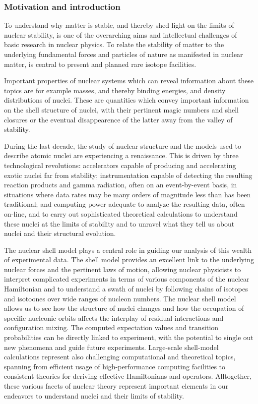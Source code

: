 \documentclass{beamer}
\begin{document}
\begin{frame}
\titlepage
\end{frame}

\begin{frame}
\frametitle{Motivation and introduction}

\begin{block}{}
To understand why matter is stable, and thereby shed light on the
limits of nuclear stability, is one of the overarching aims and
intellectual challenges of basic research in nuclear physics. To
relate the stability of matter to the underlying fundamental forces
and particles of nature as manifested in nuclear matter, is central to
present and planned rare isotope facilities.  

Important properties of nuclear systems which can reveal information about these topics are
for example masses, and thereby binding energies, and density
distributions of nuclei.  These are quantities which convey important
information on the shell structure of nuclei, with their pertinent
magic numbers and shell closures or the eventual disappearence of the
latter away from the valley of stability.  

During the last decade,  the study of nuclear
structure and the models used to describe atomic nuclei are
experiencing a renaissance. This is driven by three technological
revolutions: accelerators capable of producing and accelerating exotic
nuclei far from stability; instrumentation capable of detecting the
resulting reaction products and gamma radiation, often on an
event-by-event basis, in situations where data rates may be many
orders of magnitude less than has been traditional; and computing
power adequate to analyze the resulting data, often on-line, and to
carry out sophisticated theoretical calculations to understand these
nuclei at the limits of stability and to unravel what they tell us
about nuclei and their structural evolution. 

The nuclear shell model plays a central role in guiding our analysis
of this wealth of experimental data.  
The shell model provides an
excellent link to the underlying nuclear forces and the pertinent laws
of motion, allowing nuclear physicists to interpret complicated
experiments in terms of various components of the nuclear Hamiltonian
and to understand a swath of nuclei by following chains of isotopes
and isotoones over wide ranges of nucleon numbers. The nuclear shell
model allows us to see how the structure of nuclei changes and how the
occupation of specific nucleonic orbits affects the interplay of
residual interactions and configuration mixing.  The computed
expectation values and transition probabilities can be directly linked
to experiment, with the potential to single out new phenomena and
guide future experiments.  Large-scale shell-model calculations
represent also challenging computational and theoretical topics,
spanning from efficient usage of high-performance computing facilities
to consistent theories for deriving effective Hamiltonians and
operators.  Alltogether, these various facets of nuclear theory
represent important elements in our endeavors to understand nuclei and
their limits of stability.  


\end{block}
\end{frame}
\end{document}
